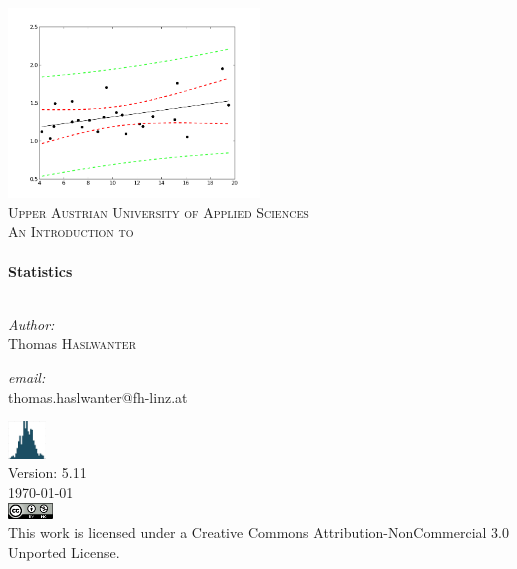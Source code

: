 \begin{titlepage}

\begin{center}


\includegraphics[width=0.5\textwidth]{../Images/regression.png}\\[1cm]

\textsc{\LARGE Upper Austrian University of Applied Sciences }\\[1.5cm]

\textsc{\Large An Introduction to}\\[0.5cm]


\HRule \\[0.4cm]
{ \huge \bfseries Statistics}\\[0.4cm]

\HRule \\[1.5cm]

\begin{minipage}{0.4\textwidth}
\begin{flushleft} \large
\emph{Author:}\\
Thomas \textsc{Haslwanter}
\end{flushleft}
\end{minipage}
\begin{minipage}{0.4\textwidth}
\begin{flushright} \large
\emph{email:} \\
{\small thomas.haslwanter@fh-linz.at}
\end{flushright}
\end{minipage}

\vfill

\includegraphics[width=1cm]{../Images/StatsLogo_green.png}\\
Version: 5.11 \\
{\large \today} \\[1cm]
\includegraphics[width=1.2cm]{../Images/cc_licence.png}\\
\footnotesize{This work is licensed under a Creative Commons Attribution-NonCommercial 3.0 Unported License.}


\end{center}

\end{titlepage}
